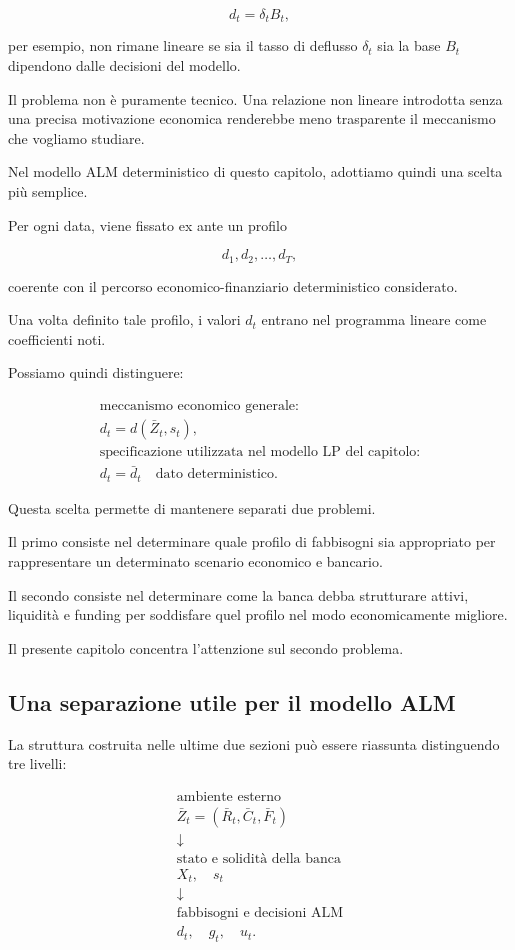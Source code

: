 \[
d_t
=
\delta_t B_t,
\]

\noindent per esempio, non rimane lineare se sia il tasso di deflusso $\delta_t$ sia la
base $B_t$ dipendono dalle decisioni del modello.

Il problema non \`e puramente tecnico. Una relazione non lineare introdotta
senza una precisa motivazione economica renderebbe meno trasparente il
meccanismo che vogliamo studiare.

Nel modello ALM deterministico di questo capitolo, adottiamo quindi una scelta
pi\`u semplice.

Per ogni data, viene fissato ex ante un profilo

\[
d_1,d_2,\ldots,d_T,
\]

\noindent coerente con il percorso economico-finanziario deterministico considerato.

Una volta definito tale profilo, i valori $d_t$ entrano nel programma lineare
come coefficienti noti.

Possiamo quindi distinguere:

\[
\boxed{
\begin{array}{c}
\text{meccanismo economico generale:}\\[2pt]
d_t=d(\bar Z_t,s_t),
\\[8pt]
\text{specificazione utilizzata nel modello LP del capitolo:}\\[2pt]
d_t=\bar d_t\quad\text{dato deterministico}.
\end{array}
}
\]

Questa scelta permette di mantenere separati due problemi.

Il primo consiste nel determinare quale profilo di fabbisogni sia appropriato
per rappresentare un determinato scenario economico e bancario.

Il secondo consiste nel determinare come la banca debba strutturare attivi,
liquidit\`a e funding per soddisfare quel profilo nel modo economicamente
migliore.

Il presente capitolo concentra l'attenzione sul secondo problema.

\subsection{Una separazione utile per il modello ALM}

La struttura costruita nelle ultime due sezioni pu\`o essere riassunta
distinguendo tre livelli:

\[
\boxed{
\begin{array}{c}
\text{ambiente esterno}\\
\bar Z_t=(\bar R_t,\bar C_t,\bar F_t)
\\[6pt]
\downarrow
\\[6pt]
\text{stato e solidit\`a della banca}\\
X_t,\quad s_t
\\[6pt]
\downarrow
\\[6pt]
\text{fabbisogni e decisioni ALM}\\
d_t,\quad g_t,\quad u_t.
\end{array}
}
\]

